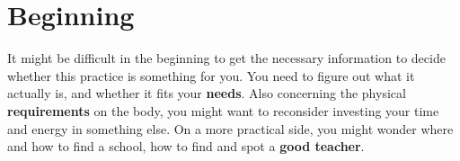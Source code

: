 \chapter{Beginning}\label{ch:beginning}


It might be difficult in the beginning to get the necessary information to decide whether this practice is something for you.
You need to figure out what it actually is, and whether it fits your \textbf{needs}.
Also concerning the physical \textbf{requirements} on the body, you might want to reconsider investing your time and energy in something else.
On a more practical side, you might wonder where and how to find a school, how to find and spot a \textbf{good teacher}.




